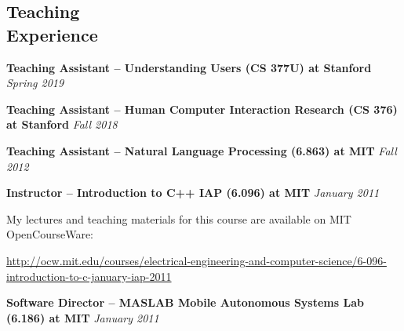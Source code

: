 \documentclass[margin,line]{resume}
\begin{document}
\begin{resume}
\section{\mysidestyle Teaching\\Experience}

\textbf{Teaching Assistant -- Understanding Users (CS 377U) at Stanford} \hfill \textsl{Spring 2019} \\

\vspace{-8mm}

\textbf{Teaching Assistant -- Human Computer Interaction Research (CS 376) at Stanford} \hfill \textsl{Fall 2018} \\

\vspace{-8mm}

\textbf{Teaching Assistant -- Natural Language Processing (6.863) at MIT} \hfill \textsl{Fall 2012} \\

\vspace{-8mm}

\textbf{Instructor -- Introduction to C++ IAP (6.096) at MIT} \hfill \textsl{January 2011}\\

\vspace{-8mm}

My lectures and teaching materials for this course are available on MIT OpenCourseWare:\\

\vspace{-8mm}

\url{http://ocw.mit.edu/courses/electrical-engineering-and-computer-science/6-096-introduction-to-c-january-iap-2011} \\

\vspace{-7mm}

\textbf{Software Director -- MASLAB Mobile Autonomous Systems Lab (6.186) at MIT} \hfill \textsl{January 2011}\\


\end{resume}
\end{document}
